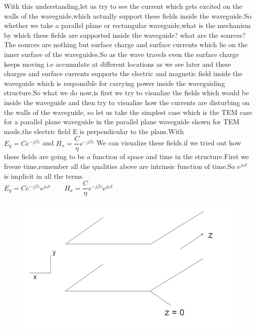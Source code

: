 With this understanding,let us try to see the current which gets excited on the walls of the waveguide,which actually support these fields inside the waveguide.So whether we take a parallel plane or rectangular waveguide,what is the mechanism by which these fields are supported inside the waveguide? what are the sources? The sources are nothing but surface charge and surface currents which lie on the inner surface of the waveguides.So as the wave travels even the surface charge keeps moving i.e accumulate at different locations as we see later and these charges and surface currents supports the electric and magnetic field inside the waveguide which is responsible for carrying power inside the waveguiding structure.So what we do now,is first we try to visualize the fields which would be inside the waveguide and then try to visualize how the currents are disturbing on the walls of the waveguide, so let us take the simplest case which is the TEM case for a parallel plane waveguide in the parallel plane waveguide shown for TEM mode,the electric field E is perpendicular to the plans.With\\
${E_y = Ce^{-j\beta z}}$ and ${H_x = \dfrac{C}{\eta}e^{-j\beta z}}$ We can visualize these fields.if we tried out how these fields are going to be a function of space and time in the structure.First we freeze time,remember all the qualities above are intrinsic function of time.So ${e^{j\omega t}}$ is implicit in all the terms\\
$E_y = Ce^{-j\beta z}e^{j\omega t}\qquad H_x = {\dfrac{C}{\eta}}e^{-j\beta z} e^{j\omega t}$
\begin{figure}[h]
\centering
\includegraphics[width=.7\linewidth]{./graphics/page6}
\caption{}
\end{figure}

